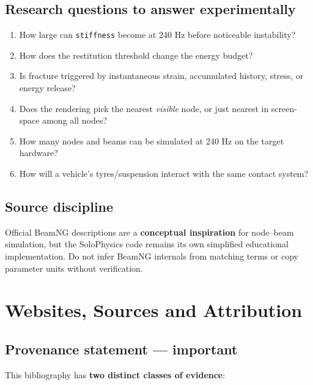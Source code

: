 \documentclass[
  10pt,
  a4paper,
]{article}
\providecommand{\tightlist}{%
  \setlength{\itemsep}{0pt}\setlength{\parskip}{0pt}}
\begin{document}
\subsection{Research questions to answer
experimentally}\label{research-questions-to-answer-experimentally}

\begin{enumerate}
\def\labelenumi{\arabic{enumi}.}
\tightlist
\item
  How large can \texttt{stiffness} become at 240 Hz before noticeable
  instability?
\item
  How does the restitution threshold change the energy budget?
\item
  Is fracture triggered by instantaneous strain, accumulated history,
  stress, or energy release?
\item
  Does the rendering pick the nearest \emph{visible} node, or just
  nearest in screen-space among all nodes?
\item
  How many nodes and beams can be simulated at 240 Hz on the target
  hardware?
\item
  How will a vehicle's tyres/suspension interact with the same contact
  system?
\end{enumerate}

\subsection{Source discipline}\label{source-discipline}

Official BeamNG descriptions are a \textbf{conceptual inspiration} for
node--beam simulation, but the SoloPhysics code remains its own
simplified educational implementation. Do not infer BeamNG internals
from matching terms or copy parameter units without verification.

\newpage

\section{Websites, Sources and
Attribution}\label{websites-sources-and-attribution}

\subsection{Provenance statement ---
important}\label{provenance-statement-important}

This bibliography has \textbf{two distinct classes of evidence}:
\end{document}
